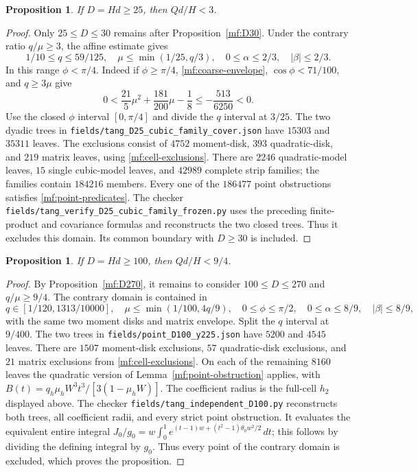 \documentclass[11pt,reqno]{amsart}
\numberwithin{equation}{section}
\newtheorem{proposition}[theorem]{Proposition}
\theoremstyle{definition}
\theoremstyle{remark}
\DeclareRobustCommand{\cert}[1]{\nolinkurl{#1}}
\begin{document}
\begin{proposition}\label{mf:D25}
If $D=Hd\ge25$, then $Qd/H<3$.
\end{proposition}
\begin{proof}
Only $25\le D\le30$ remains after Proposition~\ref{mf:D30}.
Under the contrary ratio $q/\mu\ge3$, the affine estimate gives
\[
 1/10\le q\le59/125,\quad \mu\le\min(1/25,q/3),\quad
 0\le\alpha\le2/3,\quad|\beta|\le2/3.
\]
In this range $\phi<\pi/4$. Indeed if $\phi\ge\pi/4$,
\eqref{mf:coarse-envelope}, $\cos\phi<71/100$, and
$q\ge3\mu$ give
\[
 0<\frac{21}{5}\mu^2+\frac{181}{200}\mu-\frac18
 \le-\frac{513}{6250}<0.
\]
Use the closed $\phi$ interval $[0,\pi/4]$ and divide
the $q$ interval at $3/25$.
The two dyadic trees in
\cert{fields/tang_D25_cubic_family_cover.json}
have $15303$ and $35311$ leaves. The exclusions consist of
$4752$ moment-disk, $393$ quadratic-disk, and $219$ matrix
leaves, using \eqref{mf:cell-exclusions}.
There are $2246$ quadratic-model leaves, $15$ single
cubic-model leaves, and $42989$ complete strip families;
the families contain $184216$ members.
Every one of the $186477$ point obstructions satisfies
\eqref{mf:point-predicates}.
The checker \cert{fields/tang_verify_D25_cubic_family_frozen.py}
uses the preceding finite-product and covariance formulas and
reconstructs the two closed trees.
Thus it excludes this domain. Its common boundary
with $D\ge30$ is included.
\end{proof}

\begin{proposition}\label{mf:D100}
If $D=Hd\ge100$, then $Qd/H<9/4$.
\end{proposition}
\begin{proof}
By Proposition~\ref{mf:D270}, it remains to consider
$100\le D\le270$ and $q/\mu\ge9/4$.
The contrary domain is contained in
\[
 q\in[1/120,1313/10000],\quad
 \mu\le\min(1/100,4q/9),\quad
 0\le\phi\le\pi/2,\quad
 0\le\alpha\le8/9,\quad|\beta|\le8/9,
\]
with the same two moment disks and matrix envelope.
Split the $q$ interval at $9/400$. The two trees in
\cert{fields/point_D100_y225.json} have $5200$ and $4545$ leaves.
There are $1507$ moment-disk exclusions, $57$ quadratic-disk
exclusions, and $21$ matrix exclusions from
\eqref{mf:cell-exclusions}. On each of the
remaining $8160$ leaves the quadratic version of
Lemma~\ref{mf:point-obstruction} applies, with
$B(t)=q_h\mu_hW^3t^3/[3(1-\mu_hW)]$.
The coefficient radius is the full-cell $h_2$ displayed above.
The checker \cert{fields/tang_independent_D100.py} reconstructs
both trees, all coefficient radii, and every strict
point obstruction. It evaluates the equivalent entire integral
$J_0/g_0=w\int_0^1e^{(t-1)w+(t^2-1)\theta_0w^2/2}\,dt$;
this follows by dividing the defining integral by $g_0$.
Thus every point of the contrary domain is excluded, which
proves the proposition.
\end{proof}
\end{document}
